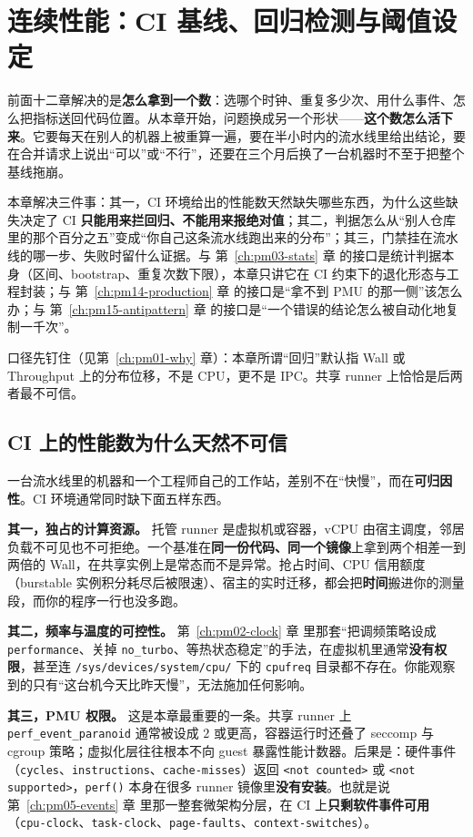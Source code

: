 \documentclass[12pt,a4paper,fontset=fandol]{ctexbook}
\newcommand{\Fn}[1]{\texttt{#1()}}
\newcommand{\Tp}[1]{\texttt{#1}}
\newcommand{\Bk}{\discretionary{}{}{}}
\newcommand{\Lang}[1]{\textsf{#1}}
\newcommand{\MWall}{\Lang{Wall}}
\newcommand{\MCpu}{\Lang{CPU}}
\newcommand{\MThr}{\Lang{Throughput}}
\newcommand{\Mx}[1]{\textsf{#1}}
\begin{document}
\chapter{连续性能：CI 基线、回归检测与阈值设定}
\label{ch:pm13-ci}

前面十二章解决的是\textbf{怎么拿到一个数}：选哪个时钟、重复多少次、用什么事件、怎么把指标送回代码位置。从本章开始，问题换成另一个形状——\textbf{这个数怎么活下来}。它要每天在别人的机器上被重算一遍，要在半小时内的流水线里给出结论，要在合并请求上说出``可以''或``不行''，还要在三个月后换了一台机器时不至于把整个基线拖崩。

本章解决三件事：其一，CI 环境给出的性能数天然缺失哪些东西，为什么这些缺失决定了 CI \textbf{只能用来拦回归、不能用来报绝对值}；其二，判据怎么从``别人仓库里的那个百分之五''变成``你自己这条流水线跑出来的分布''；其三，门禁挂在流水线的哪一步、失败时留什么证据。与 第~\ref{ch:pm03-stats} 章 的接口是统计判据本身（区间、bootstrap、重复次数下限），本章只讲它在 CI 约束下的退化形态与工程封装；与 第~\ref{ch:pm14-production} 章 的接口是``拿不到 PMU 的那一侧''该怎么办；与 第~\ref{ch:pm15-antipattern} 章 的接口是``一个错误的结论怎么被自动化地复制一千次''。

口径先钉住（见第~\ref{ch:pm01-why} 章）：本章所谓``回归''默认指 \MWall{} 或 \MThr{} 上的分布位移，不是 \MCpu{}，更不是 \Mx{IPC}。共享 runner 上恰恰是后两者最不可信。

\section{CI 上的性能数为什么天然不可信}
\label{sec:pm13-untrust}

一台流水线里的机器和一个工程师自己的工作站，差别不在``快慢''，而在\textbf{可归因性}。CI 环境通常同时缺下面五样东西。

\textbf{其一，独占的计算资源。} 托管 runner 是虚拟机或容器，vCPU 由宿主调度，邻居负载不可见也不可拒绝。一个基准在\textbf{同一份代码、同一个镜像}上拿到两个相差一到两倍的 \MWall{}，在共享实例上是常态而不是异常。抢占时间、CPU 信用额度（burstable 实例积分耗尽后被限速）、宿主的实时迁移，都会把\textbf{时间}搬进你的测量段，而你的程序一行也没多跑。

\textbf{其二，频率与温度的可控性。} 第~\ref{ch:pm02-clock} 章 里那套``把调频策略设成 \Tp{performance}、关掉 \Tp{no{\Bk}\_turbo}、等热状态稳定''的手法，在虚拟机里通常\textbf{没有权限}，甚至连 \Tp{/sys/devices/{\Bk}system/cpu/} 下的 \Tp{cpufreq} 目录都不存在。你能观察到的只有``这台机今天比昨天慢''，无法施加任何影响。

\textbf{其三，PMU 权限。} 这是本章最重要的一条。共享 runner 上 \Tp{perf{\Bk}\_event{\Bk}\_paranoid} 通常被设成 $2$ 或更高，容器运行时还叠了 seccomp 与 cgroup 策略；虚拟化层往往根本不向 guest 暴露性能计数器。后果是：硬件事件（\Tp{cycles}、\Tp{instructions}、\Tp{cache{\Bk}-misses}）返回 \Tp{<not counted>} 或 \Tp{<not supported>}，\Fn{perf} 本身在很多 runner 镜像里\textbf{没有安装}。也就是说 第~\ref{ch:pm05-events} 章 里那一整套微架构分层，在 CI 上\textbf{只剩软件事件可用}（\Tp{cpu-clock}、\Tp{task{\Bk}-clock}、\Tp{page{\Bk}-faults}、\Tp{context{\Bk}-switches}）。
\end{document}
